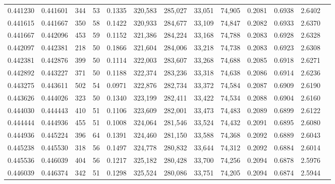 \begin{tabular}{rrrrrrrrrrrrr}
0.441230 & 0.441601 &    344 &    53 &                                     0.1335 & 320,583 & 285,027 &  33,051 &  74,905 & 0.2081 & 0.6938 & 2.6402 \\
0.441615 & 0.441667 &    350 &    58 &                                     0.1422 & 320,933 & 284,677 &  33,109 &  74,847 & 0.2082 & 0.6933 & 2.6370 \\
0.441667 & 0.442096 &    453 &    59 &                                     0.1152 & 321,386 & 284,224 &  33,168 &  74,788 & 0.2083 & 0.6928 & 2.6328 \\
0.442097 & 0.442381 &    218 &    50 &                                     0.1866 & 321,604 & 284,006 &  33,218 &  74,738 & 0.2083 & 0.6923 & 2.6308 \\
0.442381 & 0.442876 &    399 &    50 &                                     0.1114 & 322,003 & 283,607 &  33,268 &  74,688 & 0.2085 & 0.6918 & 2.6271 \\
0.442892 & 0.443227 &    371 &    50 &                                     0.1188 & 322,374 & 283,236 &  33,318 &  74,638 & 0.2086 & 0.6914 & 2.6236 \\
0.443275 & 0.443611 &    502 &    54 &                                     0.0971 & 322,876 & 282,734 &  33,372 &  74,584 & 0.2087 & 0.6909 & 2.6190 \\
0.443626 & 0.444026 &    323 &    50 &                                     0.1340 & 323,199 & 282,411 &  33,422 &  74,534 & 0.2088 & 0.6904 & 2.6160 \\
0.444030 & 0.444443 &    410 &    51 &                                     0.1106 & 323,609 & 282,001 &  33,473 &  74,483 & 0.2089 & 0.6899 & 2.6122 \\
0.444444 & 0.444936 &    455 &    51 &                                     0.1008 & 324,064 & 281,546 &  33,524 &  74,432 & 0.2091 & 0.6895 & 2.6080 \\
0.444936 & 0.445224 &    396 &    64 &                                     0.1391 & 324,460 & 281,150 &  33,588 &  74,368 & 0.2092 & 0.6889 & 2.6043 \\
0.445238 & 0.445530 &    318 &    56 &                                     0.1497 & 324,778 & 280,832 &  33,644 &  74,312 & 0.2092 & 0.6884 & 2.6014 \\
0.445536 & 0.446039 &    404 &    56 &                                     0.1217 & 325,182 & 280,428 &  33,700 &  74,256 & 0.2094 & 0.6878 & 2.5976 \\
0.446039 & 0.446374 &    342 &    51 &                                     0.1298 & 325,524 & 280,086 &  33,751 &  74,205 & 0.2094 & 0.6874 & 2.5944 \\

\end{tabular}
